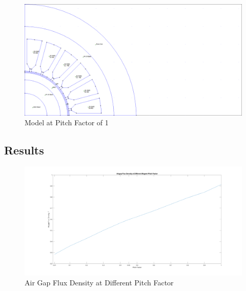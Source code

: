 \documentclass[12pt]{article}
\begin{document}
\begin{figure}[H]
    \centering
    \includegraphics[height=0.8\linewidth, trim={0 0 31cm 1.5}, clip]{img/task_9_models/task_9_1.0.png}
    \caption{Model at Pitch Factor of 1}
    \label{fig:task-9-1-pf}
\end{figure}

\subsection{Results}

\begin{figure}[H]
    \centering
    \includegraphics[width=\linewidth]{img/task_9_airgap_flux.png}
    \caption{Air Gap Flux Density at Different Pitch Factor}
    \label{fig:task-9-airgap-flux}
\end{figure}
\end{document}
